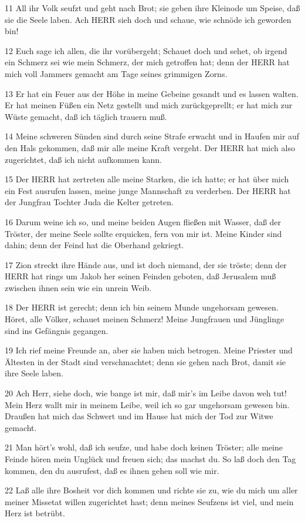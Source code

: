 \par 11 All ihr Volk seufzt und geht nach Brot; sie geben ihre Kleinode um Speise, daß sie die Seele laben. Ach HERR sieh doch und schaue, wie schnöde ich geworden bin!
\par 12 Euch sage ich allen, die ihr vorübergeht; Schauet doch und sehet, ob irgend ein Schmerz sei wie mein Schmerz, der mich getroffen hat; denn der HERR hat mich voll Jammers gemacht am Tage seines grimmigen Zorns.
\par 13 Er hat ein Feuer aus der Höhe in meine Gebeine gesandt und es lassen walten. Er hat meinen Füßen ein Netz gestellt und mich zurückgeprellt; er hat mich zur Wüste gemacht, daß ich täglich trauern muß.
\par 14 Meine schweren Sünden sind durch seine Strafe erwacht und in Haufen mir auf den Hals gekommen, daß mir alle meine Kraft vergeht. Der HERR hat mich also zugerichtet, daß ich nicht aufkommen kann.
\par 15 Der HERR hat zertreten alle meine Starken, die ich hatte; er hat über mich ein Fest ausrufen lassen, meine junge Mannschaft zu verderben. Der HERR hat der Jungfrau Tochter Juda die Kelter getreten.
\par 16 Darum weine ich so, und meine beiden Augen fließen mit Wasser, daß der Tröster, der meine Seele sollte erquicken, fern von mir ist. Meine Kinder sind dahin; denn der Feind hat die Oberhand gekriegt.
\par 17 Zion streckt ihre Hände aus, und ist doch niemand, der sie tröste; denn der HERR hat rings um Jakob her seinen Feinden geboten, daß Jerusalem muß zwischen ihnen sein wie ein unrein Weib.
\par 18 Der HERR ist gerecht; denn ich bin seinem Munde ungehorsam gewesen. Höret, alle Völker, schauet meinen Schmerz! Meine Jungfrauen und Jünglinge sind ins Gefängnis gegangen.
\par 19 Ich rief meine Freunde an, aber sie haben mich betrogen. Meine Priester und Ältesten in der Stadt sind verschmachtet; denn sie gehen nach Brot, damit sie ihre Seele laben.
\par 20 Ach Herr, siehe doch, wie bange ist mir, daß mir's im Leibe davon weh tut! Mein Herz wallt mir in meinem Leibe, weil ich so gar ungehorsam gewesen bin. Draußen hat mich das Schwert und im Hause hat mich der Tod zur Witwe gemacht.
\par 21 Man hört's wohl, daß ich seufze, und habe doch keinen Tröster; alle meine Feinde hören mein Unglück und freuen sich; das machst du. So laß doch den Tag kommen, den du ausrufest, daß es ihnen gehen soll wie mir.
\par 22 Laß alle ihre Bosheit vor dich kommen und richte sie zu, wie du mich um aller meiner Missetat willen zugerichtet hast; denn meines Seufzens ist viel, und mein Herz ist betrübt.

